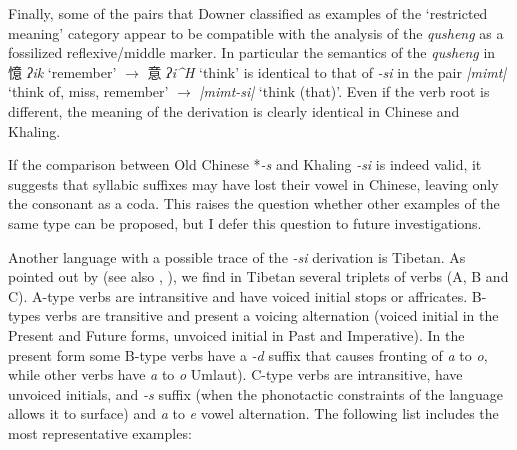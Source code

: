 \documentclass[oneside,a4paper,11pt]{article}
\newcommand{\ipa}[1]{{\phon\textit{\mbox{#1}}}}
\newcommand{\zh}[1]{{\cn#1}}
\newcommand{\ch}[3]{\zh{#1} \ipa{#2} `#3'}
\begin{document}
Finally, some of the pairs that Downer classified as examples of the `restricted meaning' category appear to be compatible with the analysis of the \textit{qusheng} as a fossilized reflexive/middle marker. In particular the semantics of the \textit{qusheng} in \ch{憶}{ʔik}{remember} $\rightarrow$ \ch{意}{ʔi^H}{think} is identical to that of \ipa{-si} in the pair \ipa{|mimt|} `think of, miss, remember' $\rightarrow$ \ipa{|mimt-si|} `think (that)'. Even if the verb root is different, the meaning of the derivation is clearly identical in Chinese and Khaling.

If the comparison between Old Chinese *\ipa{-s} and Khaling \ipa{-si} is indeed valid, it suggests that syllabic suffixes may have lost their vowel in Chinese, leaving only the consonant as a coda. This raises the question whether other examples of the same type can be proposed, but I defer this question to future investigations.

Another language with a possible trace of the \ipa{-si} derivation is Tibetan. As pointed out by \citet{hill14voicing} (see also \citealt{uray53morphology}, \citealt[864]{zeisler04}), we find in Tibetan several triplets of verbs (A, B and C). A-type verbs are intransitive and have voiced initial stops or affricates. B-types verbs are transitive and present a voicing alternation (voiced initial in the Present and Future forms, unvoiced initial in Past and Imperative). In the present form some B-type verbs have a \ipa{-d} suffix that causes fronting of \ipa{a} to \ipa{o}, while other verbs have \ipa{a} to \ipa{o} Umlaut). C-type verbs are intransitive, have unvoiced initials, and \ipa{-s} suffix (when the phonotactic constraints of the language allows it to surface) and \ipa{a} to \ipa{e} vowel alternation. The following list includes the most representative examples:
\end{document}
